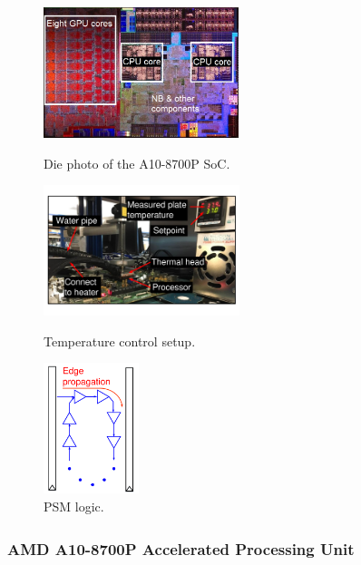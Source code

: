 \begin{figure}[t!]
  \centering
  \begin{minipage}{0.37\linewidth}
    \centering
                \includegraphics[trim=0 0 0 0,clip,height=1.5in]{graphs/temperature/carrizo-die.jpg}
                \caption{Die photo of the A10-8700P SoC.}
                \label{fig:die-shot}
  \end{minipage}
\hfill
  \begin{minipage}{0.37\linewidth}
    \centering
                \includegraphics[trim=0 55 0 55,clip,height=1.5in]{graphs/temperature/temperature-control.pdf}
                \caption{Temperature control setup.}
                \label{fig:temp-control-photo}
  \end{minipage}
\hfill
  \begin{minipage}{0.20\linewidth}
    \centering
                \includegraphics[trim=40 0 40 0,clip,height=1.5in]{graphs/temperature/psm-struct.pdf}
                \caption{PSM logic.}
                \label{fig:psm-struct}
  \end{minipage}
  \vspace*{-0.08in}
\end{figure}

\subsubsection{AMD\textsuperscript{\textregistered} A10-8700P Accelerated Processing Unit}
\label{sec:temperature:setup:apu}

